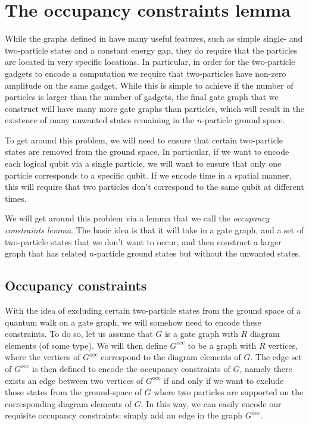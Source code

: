 \documentclass[../thesis-main/thesis-main]{subfiles}
\begin{document}
%

\section{The occupancy constraints lemma}\label{sec:occupancy_constraints_lemma}

While the graphs defined in  have many useful features, such as simple single- and two-particle states and a constant energy gap, they do require that the particles are located in very specific locations.  In particular, in order for the two-particle gadgets to encode a computation we require that two-particles have non-zero amplitude on the same gadget.  While this is simple to achieve if the number of particles is larger than the number of gadgets, the final gate graph that we construct will have many more gate graphs than particles, which will result in the existence of many unwanted states remaining in the $n$-particle ground space.

To get around this problem, we will need to ensure that certain two-particle states are removed from the ground space.  In particular, if we want to encode each logical qubit via a single particle, we will want to ensure that only one particle corresponds to a specific qubit.  If we encode time in a spatial manner, this will require that two particles don't correspond to the same qubit at different times.

We will get around this problem via a lemma that we call the \emph{occupancy constraints lemma}.  The basic idea is that it will take in a gate graph, and a set of two-particle states that we don't want to occur, and then construct a larger graph that has related $n$-particle ground states but without the unwanted states.

\subsection{Occupancy constraints}
\label{sec:occupancy_constraints}

With the idea of excluding certain two-particle states from the ground space of a quantum walk on a gate graph, we will somehow need to encode these constraints.  To do so, let us assume that $G$ is a gate graph with $R$ diagram elements (of some type).  We will then define $G^{\text{occ}}$ to be a graph with $R$ vertices, where the vertices of $G^{\text{occ}}$ correspond to the diagram elements of $G$.  The edge set of $G^{\text{occ}}$ is then defined to encode the occupancy constraints of $G$, namely there exists an edge between two vertices of $G^{\text{occ}}$ if and only if we want to exclude those states from the ground-space of $G$ where two particles are supported on the corresponding diagram elements of $G$.  In this way, we can easily encode our requisite occupancy constraints: simply add an edge in the graph $G^{\text{occ}}$.
\end{document}
